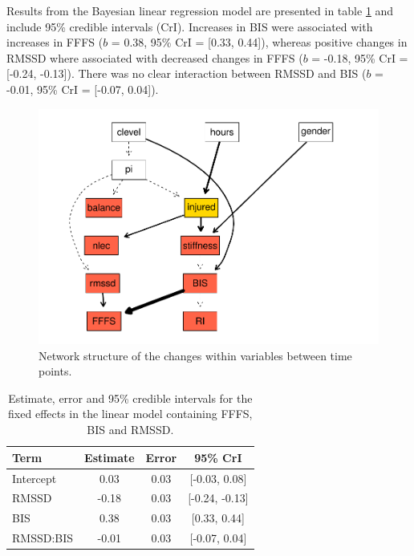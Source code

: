 \documentclass[
  english,
  man,floatsintext]{apa6}
\begin{document}
Results from the Bayesian linear regression model are presented in table \ref{tab:bm1} and include 95\% credible intervals (CrI).
Increases in BIS were associated with increases in FFFS (\(b\) = 0.38, 95\% CrI = {[}0.33, 0.44{]}), whereas positive changes in RMSSD where associated with decreased changes in FFFS (\(b\) = -0.18, 95\% CrI = {[}-0.24, -0.13{]}).
There was no clear interaction between RMSSD and BIS (\(b\) = -0.01, 95\% CrI = {[}-0.07, 0.04{]}).

\begin{figure}[H]

{\centering \includegraphics{full_phd_files/figure-latex/changenetwork-1} 

}

\caption{Network structure of the changes within variables between time points.}\label{fig:changenetwork}
\end{figure}

\begin{table}[H]

\begin{center}
\begin{threeparttable}

\caption{\label{tab:bm1}Estimate, error and 95\% credible intervals for the fixed effects in the linear model containing FFFS, BIS and RMSSD.}

\begin{tabular}{lccc}
\toprule
Term & Estimate & Error & 95\% CrI\\
\midrule
Intercept & 0.03 & 0.03 & [-0.03, 0.08]\\
RMSSD & -0.18 & 0.03 & [-0.24, -0.13]\\
BIS & 0.38 & 0.03 & [0.33, 0.44]\\
RMSSD:BIS & -0.01 & 0.03 & [-0.07, 0.04]\\
\bottomrule
\end{tabular}

\end{threeparttable}
\end{center}

\end{table}
\end{document}
